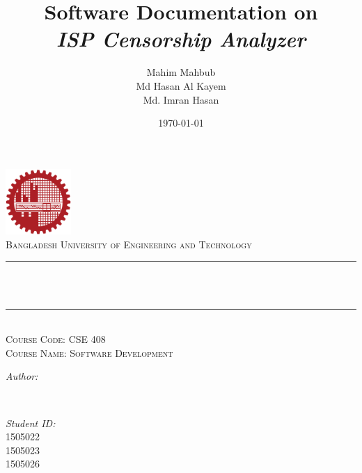 \documentclass[12pt]{article}
\title{Software Documentation on \vspace{0.5cm}\\
\emph{ISP Censorship Analyzer}	}
\author{Mahim Mahbub\\
Md Hasan Al Kayem\\
Md. Imran Hasan}
\date{\today}
\makeatletter
\let\thetitle\@title
\let\theauthor\@author
\let\thedate\@date
\makeatother
\begin{document}

\begin{titlepage}
	\centering
    \vspace*{0.5 cm}
    \includegraphics[height=2.5cm]{buet_logo.png}\\[1.0 cm]	%
    \textsc{\large Bangladesh University of Engineering and Technology}\\[2.0 cm]	%
	\rule{\linewidth}{0.2 mm} \\[0.4 cm]
	{ \huge \bfseries \thetitle}\\
	\rule{\linewidth}{0.2 mm} \\[1.5 cm]
	\textsc{\Large Course Code: CSE 408}\\[0.5 cm]				%
	\textsc{\large Course Name: Software Development}\\[0.5 cm]				%
    \vspace{1cm}
	\begin{minipage}{0.4\textwidth}
		\begin{flushleft} \large
			\emph{Author:}\\
			\theauthor
			\end{flushleft}
			\end{minipage}~
			\begin{minipage}{0.4\textwidth}
			\begin{flushright} \large
			\emph{Student ID:} \\
			1505022\\
			1505023\\
			1505026
		\end{flushright}
	\end{minipage}\\[2 cm]
	
	{\large \thedate}\\[2 cm]
 
	\vfill
	
\end{titlepage}

\end{document}
